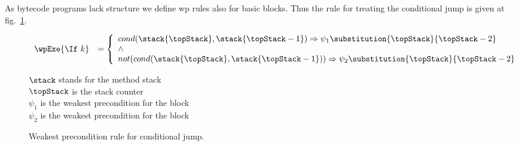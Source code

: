 As bytecode programs lack structure we define wp rules also for basic
blocks. Thus the rule for treating the conditional jump is given at
fig.~\ref{wpBlock}.

\begin{figure}[!hbp]
 $$ \begin{array}{ll}
                 \wpExe{\If \ k} & =  \left\{ \begin{array}{l}
                                                cond( \stack{\topStack}, \stack{\topStack - 1}) \Rightarrow  \psi_{1}\substitution{\topStack }{\topStack - 2}   \\                                                              \wedge \\
                                        not (cond( \stack{\topStack}, \stack{\topStack - 1})) \Rightarrow \psi_{2}\substitution{\topStack}{\topStack - 2 }  
                                        \end{array} 
                                   \right. 
         \end{array}
     $$


$\stack$ stands for the method stack \\
$\topStack$ is the stack counter \\
$\psi_{1}$ is the weakest precondition for the block  \\
$\psi_{2}$ is the weakest precondition for the block 
\caption{Weakest precondition rule for conditional jump.}
 \label{wpBlock}
\end{figure}


